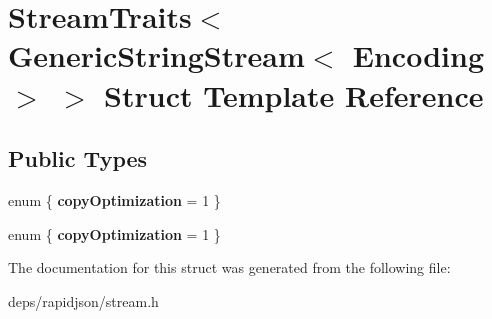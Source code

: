 \hypertarget{struct_stream_traits_3_01_generic_string_stream_3_01_encoding_01_4_01_4}{}\section{Stream\+Traits$<$ Generic\+String\+Stream$<$ Encoding $>$ $>$ Struct Template Reference}
\label{struct_stream_traits_3_01_generic_string_stream_3_01_encoding_01_4_01_4}
\subsection*{Public Types}
\begin{DoxyCompactItemize}
\item 
enum \{ {\bfseries copy\+Optimization} = 1
 \}\hypertarget{struct_stream_traits_3_01_generic_string_stream_3_01_encoding_01_4_01_4_a23baa9380940615a3b3a697ca02b2ab0}{}\label{struct_stream_traits_3_01_generic_string_stream_3_01_encoding_01_4_01_4_a23baa9380940615a3b3a697ca02b2ab0}

\item 
enum \{ {\bfseries copy\+Optimization} = 1
 \}\hypertarget{struct_stream_traits_3_01_generic_string_stream_3_01_encoding_01_4_01_4_a3776d4605579074cab5adbfe4402ac75}{}\label{struct_stream_traits_3_01_generic_string_stream_3_01_encoding_01_4_01_4_a3776d4605579074cab5adbfe4402ac75}

\end{DoxyCompactItemize}


The documentation for this struct was generated from the following file\+:\begin{DoxyCompactItemize}
\item 
deps/rapidjson/stream.\+h\end{DoxyCompactItemize}
